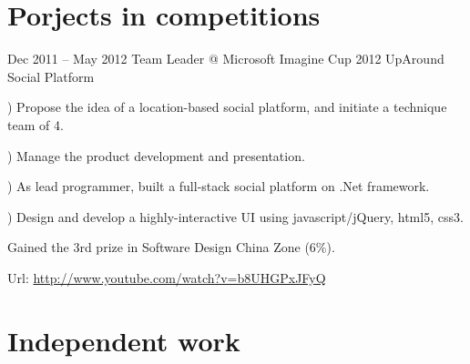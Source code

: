 \documentclass{tccv}
\begin{document}
\section{Porjects in competitions}


\begin{eventlist}

\item{Dec 2011 -- May 2012}
     {Team Leader @ Microsoft Imagine Cup 2012}
     {UpAround Social Platform}
     
     ) Propose the idea of a location-based social platform, and initiate a technique team of 4.
     
     ) Manage the product development and presentation.
     
     ) As lead programmer, built a full-stack social platform on .Net framework. 
     
     ) Design and develop a highly-interactive UI using javascript/jQuery, html5, css3.
     
Gained the 3rd prize in Software Design China Zone (6\%).   

Url: \underline{http://www.youtube.com/watch?v=b8UHGPxJFyQ}
       
\end{eventlist}

















\section{Independent work}
\end{document}
